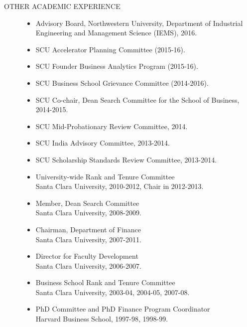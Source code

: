 \documentclass{article}
\begin{document}
\begin{description} 
\item[OTHER ACADEMIC EXPERIENCE] \mbox{}

\begin{itemize}
\setlength\itemsep{-0.1em}

\item Advisory Board, Northwestern University, Department of Industrial Engineering and Management Science (IEMS), 2016. 

\item SCU Accelerator Planning Committee (2015-16). 

\item SCU Founder Business Analytics Program (2015-16). 

\item SCU Business School Grievance Committee (2014-2016). 

\item SCU Co-chair, Dean Search Committee for the School of Business, 2014-2015.

\item SCU Mid-Probationary Review Committee, 2014.

\item SCU India Advisory Committee, 2013-2014.

\item SCU Scholarship Standards Review Committee, 2013-2014.


\item University-wide Rank and Tenure Committee\\
        Santa Clara University, 2010-2012, Chair in 2012-2013.

\item Member, Dean Search Committee\\
	Santa Clara University, 2008-2009.

\item Chairman, Department of Finance\\
	Santa Clara University, 2007-2011.

\item Director for Faculty Development\\
	Santa Clara University, 2006-2007.

\item Business School Rank and Tenure Committee \\
	Santa Clara University, 2003-04, 2004-05, 2007-08.

\item PhD Committee and PhD Finance Program Coordinator\\
        Harvard Business School, 1997-98, 1998-99.
        
\end{itemize}

\end{description}
\end{document}
